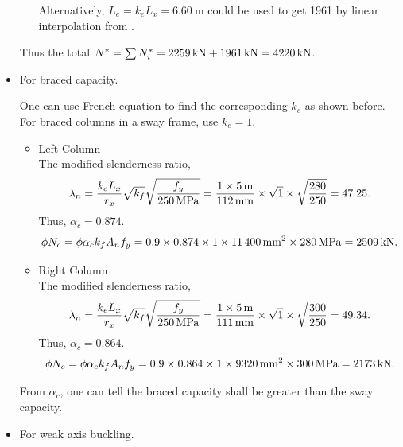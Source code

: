 \begin{solution}
\begin{itemize}
\begin{itemize}
Alternatively, $L_e=k_eL_x=\SI{6.60}{\m}$ could be used to get \SI{1961}{\kn} by linear interpolation from .
\end{itemize}
Thus the total $N^*=\sum{}N^*_i=\SI{2259}{\kilo\newton}+\SI{1961}{\kilo\newton}=\SI{4220}{\kilo\newton}$.
\item For braced capacity.

One can use French equation to find the corresponding $k_e$ as shown before. For braced columns in a sway frame, use $k_e=1$.
\begin{itemize}
\item Left Column\\
The modified slenderness ratio,
\begin{gather*}
\lambda_n=\dfrac{k_eL_x}{r_x}\sqrt{k_f}\sqrt{\dfrac{f_y}{\SI{250}{\mega\pascal}}}=\dfrac{1\times\SI{5}{\meter}}{\SI{112}{\milli\meter}}\times\sqrt{1}\times\sqrt{\dfrac{280}{250}}=47.25.
\end{gather*}
Thus, $\alpha_c=0.874$.
\begin{gather*}
\phi{}N_c=\phi\alpha_ck_fA_nf_y=0.9\times0.874\times1\times\SI{11400}{\milli\meter^2}\times\SI{280}{\mega\pascal}=\SI{2509}{\kilo\newton}.
\end{gather*}
\item Right Column\\
The modified slenderness ratio,
\begin{gather*}
\lambda_n=\dfrac{k_eL_x}{r_x}\sqrt{k_f}\sqrt{\dfrac{f_y}{\SI{250}{\mega\pascal}}}=\dfrac{1\times\SI{5}{\meter}}{\SI{111}{\milli\meter}}\times\sqrt{1}\times\sqrt{\dfrac{300}{250}}=49.34.
\end{gather*}
Thus, $\alpha_c=0.864$.
\begin{gather*}
\phi{}N_c=\phi\alpha_ck_fA_nf_y=0.9\times0.864\times1\times\SI{9320}{\milli\meter^2}\times\SI{300}{\mega\pascal}=\SI{2173}{\kilo\newton}.
\end{gather*}
\end{itemize}
From $\alpha_c$, one can tell the braced capacity shall be greater than the sway capacity.
\item For weak axis buckling.


\end{itemize}
\end{solution}

